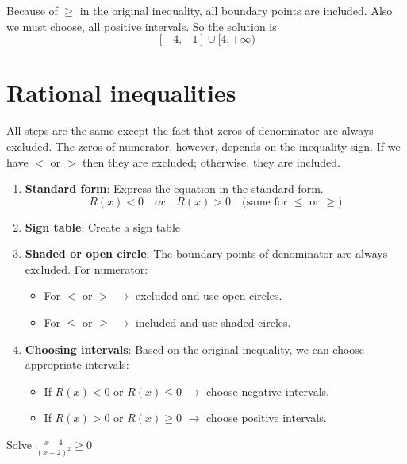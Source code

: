 Because of $\ge $ in the original inequality, all boundary points are included. Also we must choose, all positive intervals. So the solution is 
\[
            [-4,-1] \cup [4,+\infty)
\]
\section{Rational inequalities}
All steps are the same except the fact that zeros of denominator are always excluded. The zeros of numerator, however, depends on the inequality sign. If we have $<$ or $>$ then they are excluded; otherwise, they are included.
\begin{tcolorbox}[title=Solving a rational inequality, 
                  fonttitle=\bfseries,
                  colframe=blue!75!black,
                  colback=blue!5!white]
    \begin{enumerate}[1.]
        \item \textbf{Standard form}: Express the equation in the standard form.
        \[
            R(x) <0 \quad or \quad R(x)>0 \quad  \text{(same for $\le$ or $\ge$)}
        \]
        \item \textbf{Sign table}: Create a sign table
        \item \textbf{Shaded or open circle}: The boundary points of denominator are always excluded. For numerator:
            \begin{itemize}
                \item For $<$ or $>$ $\longrightarrow$ excluded and use open circles.
                \item For $\le$ or $\ge$ $\longrightarrow$ included and use shaded circles.
            \end{itemize}
        \item \textbf{Choosing intervals}: Based on the original inequality, we can choose appropriate intervals:
            \begin{itemize}
                \item If $R(x)<0$ or $R(x) \le 0$ $\longrightarrow$ choose negative intervals.
                \item If $R(x)>0$ or $R(x) \ge 0$ $\longrightarrow$ choose positive intervals.
            \end{itemize}
    \end{enumerate}
\end{tcolorbox}
\begin{exa}
    Solve $\frac{x-4}{(x-2)^2} \ge 0$
\end{exa}
